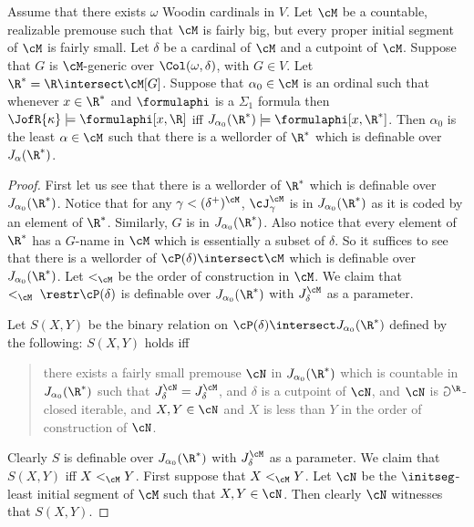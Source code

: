 \begin{lemma}
\label{lemmaA}
Assume that there exists $\omega$ Woodin cardinals in $V$.
Let $\cM$ be a countable, realizable premouse such that $\cM$ is
fairly big, but every proper initial segment of $\cM$ is fairly
small.  Let $\delta$ be a  cardinal of $\cM$ and a cutpoint of $\cM$.
Suppose that
 $G$ is $\cM$-generic over $\Col(\omega,\delta)$, with $G\in V$.
Let $\R^*=\R\intersect\cM[G]$.
Suppose that $\alpha_0\in\cM$ is an ordinal
such that whenever $x\in\R^*$ and $\formulaphi$ is a $\Sigma_1$ formula
then $\JofR{\kappa}\models\formulaphi[x,\R]$ iff
 $J_{\alpha_0}(\R^*)\models\formulaphi[x,\R^*]$.  Then $\alpha_0$ is
the least $\alpha\in\cM$ such that there is a wellorder of $\R^*$ which
is definable over $J_{\alpha}(\R^*)$.
\end{lemma}
\begin{proof}
First let us see that there is a wellorder of $\R^*$ which is definable
over $J_{\alpha_0}(\R^*)$.
Notice that for any $\gamma<(\delta^+)^{\cM}$,
 $\cJ_{\gamma}^{\cM}$  is
in $J_{\alpha_0}(\R^*)$ as it is coded by an element of $\R^*$.
Similarly, $G$ is in $J_{\alpha_0}(\R^*)$.
Also notice that every element of $\R^*$ has a $G$-name
in $\cM$ which is essentially a subset of $\delta$.
So it suffices to see that there is a wellorder of
$\cP(\delta)\intersect\cM$
which is definable over $J_{\alpha_0}(\R^*)$.
Let $<_{\cM}$ be the order
of construction in $\cM$. We claim that
 $<_{\cM}\;\restr \cP(\delta)$ is
definable over $J_{\alpha_0}(\R^*)$ with $J_{\delta}^{\cM}$ as
a parameter.


Let $S(X,Y)$ be the binary relation on
$\cP(\delta)\intersect J_{\alpha_0}(\R^*)$ defined by the following:
$S(X,Y)$ holds iff
\begin{quote}
there exists a fairly small
premouse $\cN$ in $J_{\alpha_0}(\R^*)$ which is countable
in $J_{\alpha_0}(\R^*)$ such that $J^{\cN}_{\delta}=J^{\cM}_{\delta}$,
and $\delta$ is a cutpoint of $\cN$, and $\cN$ is $\Game^{\R}$-closed
iterable, and $X,Y\in\cN$ and $X$ is less than $Y$ in the order of
construction of $\cN$.
\end{quote}
Clearly $S$ is definable over
$J_{\alpha_0}(\R^*)$ with $J_{\delta}^{\cM}$ as
a parameter.  We claim that $S(X,Y)$ iff $X<_{\cM}Y$. First suppose that
$X<_{\cM}Y$. Let $\cN$ be the $\initseg$-least initial segment of $\cM$
such that $X,Y\in\cN$. Then clearly $\cN$ witnesses that $S(X,Y)$.


\end{proof}
